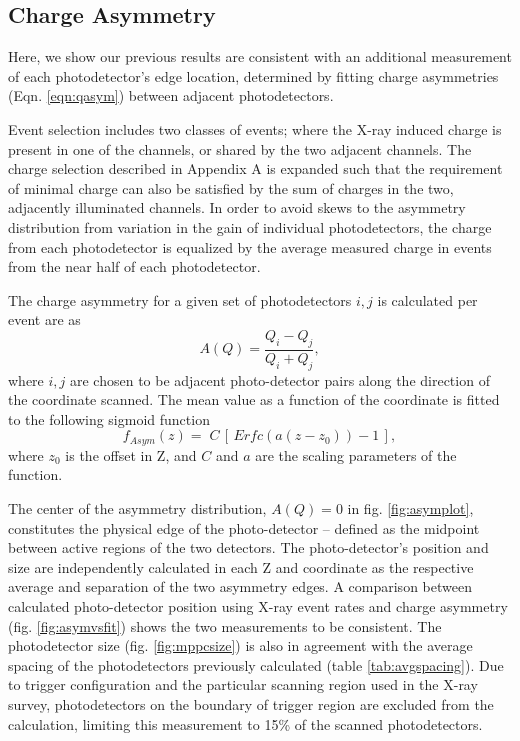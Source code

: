 
\subsection{Charge Asymmetry} \label{sec:chargeasym}

Here, we show our previous results are consistent with
an additional measurement of each photodetector's edge location,
determined by fitting charge asymmetries (Eqn. \ref{eqn:qasym}) between
adjacent photodetectors. 

Event selection includes two classes of events; where the X-ray
induced charge is present in one of the channels, or shared by the two
adjacent channels.  The charge selection described in Appendix A
is expanded such that the requirement of minimal charge
can also be satisfied by the sum of charges in the two, adjacently illuminated channels.  
In order to avoid skews to the asymmetry distribution from variation in the gain
of individual photodetectors, the charge from each photodetector is
equalized by the average measured charge in events from the near half of each photodetector.

The charge asymmetry for a given set of photodetectors $i,j$
is calculated per event are as  
\begin{equation} \label{eqn:qasym}
    A(Q)  = 
\frac{Q_{i}-Q_{j}}
     {Q_{i}+Q_{j}}, 
\end{equation}
where $i, j$ are chosen to be adjacent photo-detector pairs 
along the direction of the coordinate scanned. The mean value
as a function of the coordinate is fitted to the 
following sigmoid function
\begin{equation}\label{eqn:asymfit}
f_{Asym}(z)=\;
C\,\left[\,Erfc(a(z-z_{0}))-1\,\right],
\end{equation} 
where $z_0$ is the offset in Z, and $C$ and $a$ are 
the scaling parameters of the function.

The center of the asymmetry distribution, $A(Q)=0$ in fig.
\ref{fig:asymplot}, constitutes the physical edge of the
photo-detector -- defined as the midpoint between active regions of the two detectors.  
The photo-detector's position and size are independently calculated in each Z and \phis coordinate as the respective average and separation of the two asymmetry edges.  A
comparison between calculated photo-detector position using X-ray event
rates and charge asymmetry (fig. \ref{fig:asymvsfit}) shows the two
measurements to be consistent.  The photodetector size 
(fig. \ref{fig:mppcsize}) is also in agreement with the
average spacing of the photodetectors previously calculated (table
\ref{tab:avgspacing}).  Due to trigger configuration and the
particular scanning region used in the X-ray survey, photodetectors on
the boundary of trigger region are excluded from the calculation,
limiting this measurement to 15\% of the scanned photodetectors.


